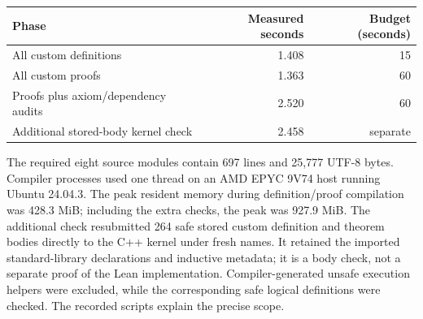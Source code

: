 \begin{center}
\begin{tabular}{lrr}
\toprule
Phase & Measured seconds & Budget (seconds)\\
\midrule
All custom definitions & 1.408 & 15\\
All custom proofs & 1.363 & 60\\
Proofs plus axiom/dependency audits & 2.520 & 60\\
Additional stored-body kernel check & 2.458 & separate\\
\bottomrule
\end{tabular}
\end{center}
The required eight source modules contain 697 lines and 25,777 UTF-8 bytes. Compiler processes used one thread on an AMD EPYC 9V74 host running Ubuntu 24.04.3. The peak resident memory during definition/proof compilation was 428.3 MiB; including the extra checks, the peak was 927.9 MiB.
The additional check resubmitted 264 safe stored custom definition and theorem bodies directly to the C++ kernel under fresh names. It retained the imported standard-library declarations and inductive metadata; it is a body check, not a separate proof of the Lean implementation. Compiler-generated unsafe execution helpers were excluded, while the corresponding safe logical definitions were checked. The recorded scripts explain the precise scope.
